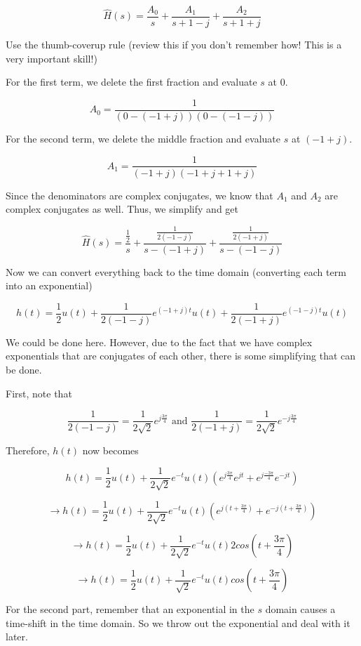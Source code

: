 \documentclass{article}
\begin{document}
$$\hat{H}(s) = \frac{A_0}{s} + \frac{A_1}{s+1-j} + \frac{A_2}{s+1+j}$$

Use the thumb-coverup rule (review this if you don't remember how! This is a very important skill!)

For the first term, we delete the first fraction and evaluate $s$ at 0.

$$A_0 = \frac{1}{(0-(-1+j))(0-(-1-j))}$$

For the second term, we delete the middle fraction and evaluate $s$ at $(-1+j)$.

$$A_1 = \frac{1}{(-1+j)(-1+j+1+j)}$$

Since the denominators are complex conjugates, we know that $A_1$ and $A_2$ are complex conjugates as well. Thus, we simplify and get

$$\hat{H}(s) = \frac{\frac{1}{2}}{s} + \frac{\frac{1}{2(-1-j)}}{s-(-1+j)} + \frac{\frac{1}{2(-1+j)}}{s-(-1-j)}$$

Now we can convert everything back to the time domain (converting each term into an exponential)

$$h(t) = \frac{1}{2} u(t) + \frac{1}{2(-1-j)}e^{(-1+j)t}u(t) + \frac{1}{2(-1+j)}e^{(-1-j)t}u(t)$$

We could be done here. However, due to the fact that we have complex exponentials that are conjugates of each other, there is some simplifying that can be done.

First, note that

$$\frac{1}{2(-1-j)} = \frac{1}{2\sqrt{2}}e^{j \frac{3\pi}{4}} \text{ and } \frac{1}{2(-1+j)} = \frac{1}{2\sqrt{2}}e^{-j \frac{3\pi}{4}}$$

Therefore, $h(t)$ now becomes

$$h(t) = \frac{1}{2}u(t) + \frac{1}{2\sqrt{2}} e^{-t}u(t) (e^{j \frac{3\pi}{4}}e^{jt} + e^{j \frac{-3\pi}{4}}e^{-jt})$$

$$\longrightarrow h(t) = \frac{1}{2}u(t) + \frac{1}{2\sqrt{2}} e^{-t}u(t) (e^{j(t +  \frac{3\pi}{4})} + e^{-j(t + \frac{3\pi}{4})})$$

$$\longrightarrow h(t) = \frac{1}{2}u(t) + \frac{1}{2\sqrt{2}} e^{-t}u(t) 2 cos(t + \frac{3 \pi}{4})$$

$$\longrightarrow h(t) = \boxed{\frac{1}{2}u(t) + \frac{1}{\sqrt{2}} e^{-t}u(t) cos(t + \frac{3 \pi}{4})}$$

\vspace{1cm}

For the second part, remember that an exponential in the $s$ domain causes a time-shift in the time domain. So we throw out the exponential and deal with it later.
\end{document}
